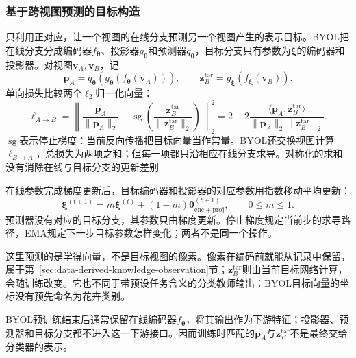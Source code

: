 \subsubsection{基于跨视图预测的目标构造}
\label{sec:data-derived-knowledge-cross-view-prediction}

只利用正对应，让一个视图的在线分支预测另一个视图产生的表示目标。BYOL把在线分支分成编码器$f_{\bm{\theta}}$、投影器$g_{\bm{\theta}}$和预测器$q_{\bm{\theta}}$，目标分支只有参数为$\bm{\xi}$的编码器和投影器。对视图$\bm{v}_A,\bm{v}_B$，记
\[
  \bm{p}_A=q_{\bm{\theta}}\!\left(g_{\bm{\theta}}(f_{\bm{\theta}}(\bm{v}_A))\right),
  \qquad
  \bm{z}^{\mathrm{tar}}_B=g_{\bm{\xi}}(f_{\bm{\xi}}(\bm{v}_B)).
\]
单向损失比较两个$\ell_2$归一化向量：
\begin{equation}
  \ell_{A\to B}
  =\left\lVert
  \frac{\bm{p}_A}{\lVert\bm{p}_A\rVert_2}
  -\operatorname{sg}\!\left(
  \frac{\bm{z}^{\mathrm{tar}}_B}{\lVert\bm{z}^{\mathrm{tar}}_B\rVert_2}
  \right)\right\rVert_2^2
  =2-2\frac{\langle\bm{p}_A,\bm{z}^{\mathrm{tar}}_B\rangle}
  {\lVert\bm{p}_A\rVert_2\lVert\bm{z}^{\mathrm{tar}}_B\rVert_2}.
  \label{eq:data-derived-knowledge-byol}
\end{equation}
$\operatorname{sg}$表示停止梯度：当前反向传播把目标向量当作常量。BYOL还交换视图计算$\ell_{B\to A}$，总损失为两项之和；但每一项都只沿相应在线分支求导。对称化的求和没有消除在线与目标分支的更新差别

在线参数完成梯度更新后，目标编码器和投影器的对应参数用指数移动平均更新：
\begin{equation}
  \bm{\xi}^{(t+1)}
  =m\bm{\xi}^{(t)}+(1-m)\bm{\theta}_{\mathrm{enc+proj}}^{(t+1)},
  \qquad 0\leq m\leq1.
  \label{eq:data-derived-knowledge-byol-ema}
\end{equation}
预测器没有对应的目标分支，其参数只由梯度更新。停止梯度规定当前步的求导路径，EMA规定下一步目标参数怎样变化；两者不是同一个操作。

这里预测的是学得向量，不是目标视图的像素。像素在编码前就能从记录中保留，属于第~\ref{sec:data-derived-knowledge-observation}节；$\bm{z}^{\mathrm{tar}}_B$则由当前目标网络计算，会随训练改变。它也不同于带预设任务含义的分类教师输出：BYOL目标向量的坐标没有预先命名为花卉类别。

BYOL预训练结束后通常保留在线编码器$f_{\bm{\theta}}$，将其输出作为下游特征；投影器、预测器和目标分支都不进入这一下游接口。因而训练时匹配的$\bm{p}_A$与$\bm{z}^{\mathrm{tar}}_B$不是最终交给分类器的表示。


